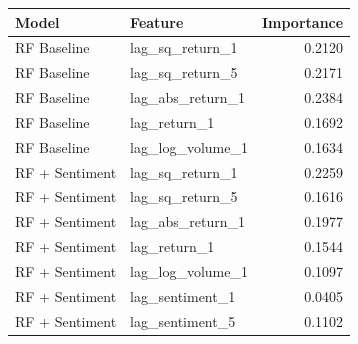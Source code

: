 \begin{table}[htbp]
\centering
\begin{tabular}{llr}
\toprule
Model & Feature & Importance \\
\midrule
RF Baseline & lag_sq_return_1 & 0.2120 \\
RF Baseline & lag_sq_return_5 & 0.2171 \\
RF Baseline & lag_abs_return_1 & 0.2384 \\
RF Baseline & lag_return_1 & 0.1692 \\
RF Baseline & lag_log_volume_1 & 0.1634 \\
RF + Sentiment & lag_sq_return_1 & 0.2259 \\
RF + Sentiment & lag_sq_return_5 & 0.1616 \\
RF + Sentiment & lag_abs_return_1 & 0.1977 \\
RF + Sentiment & lag_return_1 & 0.1544 \\
RF + Sentiment & lag_log_volume_1 & 0.1097 \\
RF + Sentiment & lag_sentiment_1 & 0.0405 \\
RF + Sentiment & lag_sentiment_5 & 0.1102 \\
\bottomrule
\end{tabular}
\label{tab:rf_feature_importance}
\end{table}
